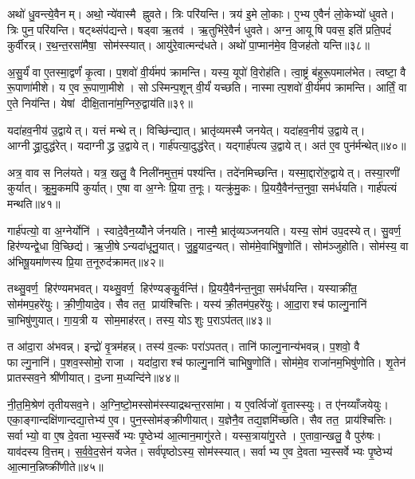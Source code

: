 अथो॑ धु॒वन्त्ये॒वैनम्। अथो॒ न्ये॑वास्मै ह्नुवते। त्रिः परि॑यन्ति। त्रय॑ इ॒मे लो॒काः। ए॒भ्य ए॒वैनं॑ लो॒केभ्यो॑ धुवते। त्रिः पुन॒परि॑यन्ति। षट्थ्संप॑द्यन्ते। षड्वा ऋ॒तव॑। ऋ॒तुभि॑रे॒वैनं॑ धुवते। अग्न॒ आयूषि पवस॒ इति॑ प्रति॒पदं॑ कुर्वीरन्न्। र॒थ॒न्त॒रसा॑मैषा॒ सोम॑स्स्यात्। आयु॑रे॒वात्मन्द॑धते। अथो॑ पा॒प्मान॑मे॒व वि॒जह॑तो यन्ति॥३८॥\anuvakamend[अ॒भिजि॑त्यै पृथि॒व्याश्च॒ स्याद॑ध्व॒र्युर्ब्रू॑याल्लो॒कयो॒ परि॑ददति कुर्वीर॒स्त्रीणि॑ च]

अ॒सु॒र्यं॑ वा ए॒तस्मा॒द्वर्णं॑ कृ॒त्वा। प॒शवो॑ वी॒र्य॑मप॑ क्रामन्ति। यस्य॒ यूपो॑ वि॒रोह॑ति। त्वा॒ष्ट्रं ब॑हुरू॒पमाल॑भेत। त्वष्टा॒ वै रू॒पाणा॑मीशे। य ए॒व रू॒पाणा॒मीशे। सोऽस्मिन्प॒शून् वी॒र्यं॑ यच्छति। नास्मात्प॒शवो॑ वी॒र्य॑मप॑ क्रामन्ति। आर्तिं॒ वा ए॒ते निय॑न्ति। येषां दीक्षि॒ताना॑म॒ग्निरु॒द्वाय॑ति॥३९॥

यदा॑हव॒नीय॑ उ॒द्वायेत्। यत्तं मन्थेत्। विच्छि॑न्द्यात्। भ्रातृ॑व्यमस्मै जनयेत्। यदा॑हव॒नीय॑ उ॒द्वायेत्। आग्नीद्ध्रा॒दुद्ध॑रेत्। यदाग्नीद्ध्र उ॒द्वायेत्। गार्\mbox{}ह॑पत्या॒दुद्ध॑रेत्। यद्गार्\mbox{}ह॑पत्य उ॒द्वायेत्। अत॑ ए॒व पुन॑र्मन्थेत्॥४०॥

अत्र॒ वाव स निल॑यते। यत्र॒ खलु॒ वै निली॑नमुत्त॒मं पश्य॑न्ति। तदे॑नमिच्छन्ति। यस्मा॒द्दारो॑रु॒द्वायेत्। तस्या॒रणी॑ कुर्यात्। क्रु॒मु॒कमपि॑ कुर्यात्। ए॒षा वा अ॒ग्नेः प्रि॒या त॒नूः। यत्क्रु॑मु॒कः। प्रि॒ययै॒वैन॑न्त॒नुवा॒ सम॑र्धयति। गार्\mbox{}ह॑पत्यं मन्थति॥४१॥

गार्\mbox{}ह॑पत्यो॒ वा अ॒ग्नेर्योनि॑। स्वादे॒वैन॒य्योँनेर्जनयति। नास्मै॒ भ्रातृ॑व्यञ्जनयति। यस्य॒ सोम॑ उप॒दस्येत्। सु॒वर्ण॒ हिर॑ण्यन्द्वे॒धा वि॒च्छिद्य॑। ऋ॒जी॒षेऽन्यदा॑धूनु॒यात्। जु॒हु॒याद॒न्यत्। सोम॑मे॒वाभि॑षु॒णोति॑। सोम॑ञ्जुहोति। सोम॑स्य॒ वा अ॑भिषू॒यमा॑णस्य प्रि॒या त॒नूरुद॑क्रामत्॥४२॥

तथ्सु॒वर्ण॒ हिर॑ण्यमभवत्। यथ्सु॒वर्ण॒ हिर॑ण्यङ्कु॒र्वन्ति॑। प्रि॒ययै॒वैन॑न्त॒नुवा॒ सम॑र्धयन्ति। यस्याक्री॑त॒ सोम॑मप॒हरे॑युः। क्री॒णी॒यादे॒व। सैव तत॒ प्राय॑श्चित्तिः। यस्य॑ क्री॒तम॑प॒हरे॑युः। आ॒दा॒राश्च॑ फाल्गु॒नानि॑ चा॒भिषु॑णुयात्। गा॒य॒त्री य सोम॒माह॑रत्। तस्य॒ योऽशुः प॒राऽप॑तत्॥४३॥

त आ॑दा॒रा अ॑भवन्न्। इन्द्रो॑ वृ॒त्रम॑हन्न्। तस्य॑ व॒ल्कः परा॑ऽपतत्। तानि॑ फाल्गु॒नान्य॑भवन्न्। प॒शवो॒ वै फाल्गु॒नानि॑। प॒शव॒स्सोमो॒ राजा। यदा॑दा॒राश्च॑ फाल्गु॒नानि॑ चाभिषु॒णोति॑। सोम॑मे॒व राजा॑नम॒भिषु॑णोति। शृ॒तेन॑ प्रातस्सव॒ने श्री॑णीयात्। द॒ध्ना म॒ध्यन्दि॑ने॥४४॥

नी॒त॒मि॒श्रेण॑ तृतीयसव॒ने। अ॒ग्नि॒ष्टो॒मस्सोम॑स्स्याद्रथन्त॒रसा॑मा। य ए॒वर्त्विजो॑ वृ॒तास्स्युः। त ए॑नय्याँजयेयुः। एका॒ङ्गान्दक्षि॑णान्दद्या॒त्तेभ्य॑ ए॒व। पुन॒स्सोम॑ङ्क्रीणीयात्। य॒ज्ञेनै॒व तद्य॒ज्ञमि॑च्छति। सैव तत॒ प्राय॑श्चित्तिः। सर्वाभ्यो॒ वा ए॒ष दे॒वताभ्य॒स्सर्वेभ्यः पृ॒ष्ठेभ्य॑ आ॒त्मान॒मागु॑रते। यस्स॒त्राया॑गु॒रते। ए॒तावा॒न्खलु॒ वै पुरु॑षः। याव॑दस्य वि॒त्तम्। स॒र्व॒वे॒द॒सेन॑ यजेत। सर्व॑पृष्ठोऽस्य॒ सोम॑स्स्यात्। सर्वाभ्य ए॒व दे॒वताभ्य॒स्सर्वेभ्यः पृ॒ष्ठेभ्य॑ आ॒त्मान॒न्निष्क्री॑णीते॥४५॥\anuvakamend[उ॒द्वाय॑ति मन्थेन्मन्थत्यक्रामत्प॒राऽप॑तन्म॒ध्यन्दि॑न आगु॒रते॒ पञ्च॑ च]

